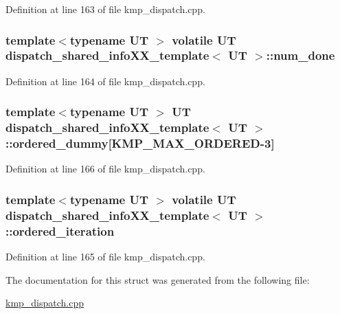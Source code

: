 Definition at line 163 of file kmp\-\_\-dispatch.\-cpp.

\hypertarget{structdispatch__shared__infoXX__template_ac7d0f74c4a438b516a94455a55c9949a}{
\subsubsection[{num\-\_\-done}]{\setlength{\rightskip}{0pt plus 5cm}template$<$typename U\-T $>$ volatile U\-T {\bf dispatch\-\_\-shared\-\_\-info\-X\-X\-\_\-template}$<$ U\-T $>$\-::num\-\_\-done}}\label{structdispatch__shared__infoXX__template_ac7d0f74c4a438b516a94455a55c9949a}


Definition at line 164 of file kmp\-\_\-dispatch.\-cpp.

\hypertarget{structdispatch__shared__infoXX__template_a90650146228be5fcac95c7dabaaa7fcc}{
\subsubsection[{ordered\-\_\-dummy}]{\setlength{\rightskip}{0pt plus 5cm}template$<$typename U\-T $>$ U\-T {\bf dispatch\-\_\-shared\-\_\-info\-X\-X\-\_\-template}$<$ U\-T $>$\-::ordered\-\_\-dummy\mbox{[}{\bf K\-M\-P\-\_\-\-M\-A\-X\-\_\-\-O\-R\-D\-E\-R\-E\-D}-\/3\mbox{]}}}\label{structdispatch__shared__infoXX__template_a90650146228be5fcac95c7dabaaa7fcc}


Definition at line 166 of file kmp\-\_\-dispatch.\-cpp.

\hypertarget{structdispatch__shared__infoXX__template_a34f55d961278aab230430ecf230ab92e}{
\subsubsection[{ordered\-\_\-iteration}]{\setlength{\rightskip}{0pt plus 5cm}template$<$typename U\-T $>$ volatile U\-T {\bf dispatch\-\_\-shared\-\_\-info\-X\-X\-\_\-template}$<$ U\-T $>$\-::ordered\-\_\-iteration}}\label{structdispatch__shared__infoXX__template_a34f55d961278aab230430ecf230ab92e}


Definition at line 165 of file kmp\-\_\-dispatch.\-cpp.



The documentation for this struct was generated from the following file\-:\begin{DoxyCompactItemize}
\item 
\hyperlink{kmp__dispatch_8cpp}{kmp\-\_\-dispatch.\-cpp}\end{DoxyCompactItemize}
